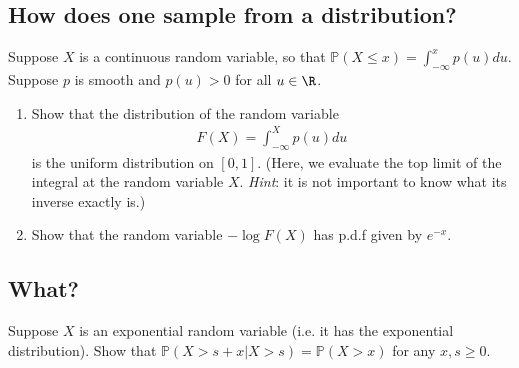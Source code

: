 \documentclass[12pt,reqno]{amsart}
\theoremstyle{definition}
\theoremstyle{remark}
\numberwithin{equation}{section}
\begin{document}
\subsection{How does one sample from a distribution?}
Suppose $X$ is a continuous random variable, so that $\mathbb{P}(X\leq x)=\int_{-\infty}^{x}p(u)du$. Suppose $p$ is smooth and $p(u)>0$ for all $u\in\R$.
\begin{enumerate}
\item Show that the distribution of the random variable 
%
\begin{align*}
F(X)=\int_{-\infty}^{X}p(u)du
\end{align*}
%
is the uniform distribution on $[0,1]$. (Here, we evaluate the top limit of the integral at the random variable $X$. \emph{Hint}: it is not important to know what its inverse exactly is.)
\item Show that the random variable $-\log F(X)$ has p.d.f given by $e^{-x}$.
\end{enumerate}
\subsection{What?}
Suppose $X$ is an exponential random variable (i.e. it has the exponential distribution). Show that $\mathbb{P}(X>s+x|X>s)=\mathbb{P}(X>x)$ for any $x,s\geq0$.
\end{document}
